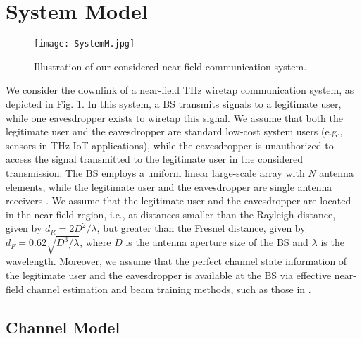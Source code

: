 \documentclass[10pt,technote]{IEEEtran}
\newcommand{\1}{\mathbbm{1}}
\begin{document}
\section{System Model}\label{Sec:System}

\begin{figure}[!t]
\centering
\texttt{[image: SystemM.jpg]}
\vspace{-1em}
\caption{Illustration of our considered near-field communication system.}\label{fig:system_model}
\vspace{-1em}
\end{figure}

We consider the downlink of a near-field THz wiretap communication system, as depicted in Fig. \ref{fig:system_model}. In this system, a BS transmits signals to a legitimate user, while one eavesdropper exists to wiretap this signal. We assume that both the legitimate user and the eavesdropper are standard low-cost system users (e.g., sensors in THz IoT applications), while the eavesdropper is unauthorized to access the signal transmitted to the legitimate user in the considered transmission. The BS employs a uniform linear large-scale array with $N$ antenna elements, while the legitimate user and the eavesdropper are single antenna receivers \cite{Chen2024tvt,zhang2024performanceanalysislowcomplexitybeamforming,Zhang2024tsp}. We assume that the legitimate user and the eavesdropper are located in the near-field region, i.e., at distances smaller than the Rayleigh distance, given by $d_R = {2D^2}/{\lambda}$, but greater than the Fresnel distance, given by $d_F = 0.62\sqrt{{D^3}/{\lambda}}$, where $D$ is the antenna aperture size of the BS and $\lambda$ is the wavelength. Moreover, we assume that the perfect channel state information of the legitimate user and the eavesdropper is available at the BS via effective near-field channel estimation and beam training methods, such as those in \cite{liu2024sensingenhancedchannelestimationnearfield,Zhang2022wcl}.

\subsection{Channel Model}
\end{document}
